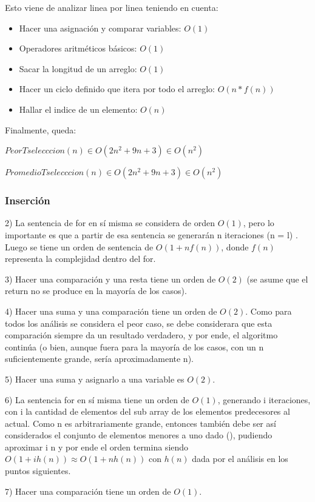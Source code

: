 \documentclass[article,a4paper]{article}
\begin{document}
Esto viene de analizar linea por linea teniendo en cuenta:
\begin{itemize}
\item Hacer una asignación y comparar variables: $O(1)$
\item Operadores aritméticos básicos: $O(1)$
\item Sacar la longitud de un arreglo: $O(1)$
\item Hacer un ciclo definido que itera por todo el arreglo: $O(n * f(n))$
\item Hallar el indice de un elemento: $O(n)$
\end{itemize}
Finalmente, queda:

$Peor T selecccion(n) \in O(2n^2 + 9n + 3) \in O(n^2)$ 

$Promedio T selecccion(n)  \in O(2n^2 + 9n + 3) \in O(n^2)$


\subsubsection{Inserción}


2) La sentencia de for en sí misma se considera de orden $O(1)$, pero lo importante es que a partir de esa sentencia se generarán n iteraciones (n = l) .  Luego se tiene un orden de sentencia de $O(1 + nf(n))$, donde $f(n)$ representa la complejidad dentro del for.

3) Hacer una comparación y una resta tiene un orden de $O(2)$ (se asume que el return no se produce en la mayoría de los casos).

4) Hacer una suma y una comparación tiene un orden de $O(2)$. Como para todos los análisis se considera el peor caso, se debe considerara que esta comparación siempre da un resultado verdadero, y por ende, el algoritmo continúa (o bien, aunque fuera para la mayoría de los casos, con un n suficientemente grande, sería aproximadamente n).

5) Hacer una suma y asignarlo a una variable es $O(2)$.

6) La sentencia for en sí misma tiene un orden de $O(1)$, generando i iteraciones, con i la cantidad de elementos del sub array de los elementos predecesores al actual. Como n es arbitrariamente grande, entonces también debe ser así considerados el conjunto de elementos menores a uno dado (), pudiendo aproximar i n y por ende el orden termina siendo $O(1 + i h(n))  \approx  O(1 + n h(n))$ con $h(n)$ dada por el análisis en los puntos siguientes.

7) Hacer una comparación tiene un orden de $O(1)$.
\end{document}
